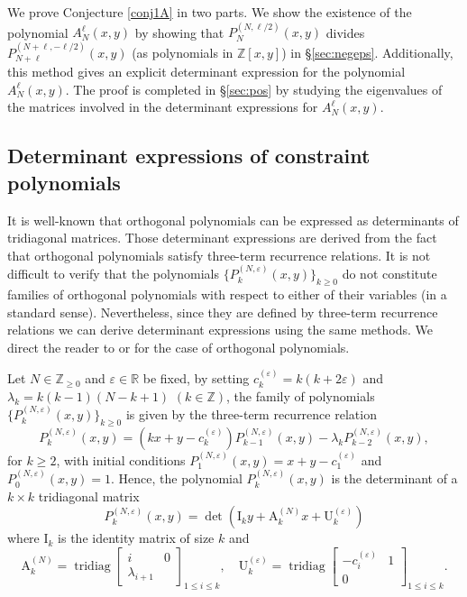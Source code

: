 \documentclass[11pt]{article}
\numberwithin{equation}{section}
\newcommand{\Z}{\mathbb{Z}} %
\newcommand{\R}{\mathbb{R}} %
\newcommand{\e}{\varepsilon}
\newcommand{\cp}[2]{P^{(#1)}_{#2}} %
\DeclareMathOperator{\tridiag}{tridiag}
\newcommand{\Tridiag}[4]{\tridiag\mat{#1 & #2 \\ #3}_{#4}}
\newcommand{\mat}[1]{\begin{bmatrix}#1\end{bmatrix}}
\newcommand{\MatSymbol}[1]{\bm{\mathrm{#1}}}
\newcommand{\mA}{\MatSymbol{A}}
\newcommand{\mI}{\MatSymbol{I}}
\newcommand{\mU}{\MatSymbol{U}}
\theoremstyle{plain}
\theoremstyle{definition}
\theoremstyle{remark}
\begin{document}
We prove Conjecture \ref{conj1A} in two parts. We show the existence of the polynomial \(A_N^{\ell}(x,y)\) by showing that
\(\cp{N,\ell/2}{N}(x,y)\) divides \(\cp{N+\ell,-\ell/2}{N+\ell}(x,y)\) (as polynomials in \(\Z[x,y]\)) in \S \ref{sec:negeps}.
Additionally, this method gives an explicit determinant expression for the polynomial \(A_N^{\ell}(x,y)\). The proof is completed
in \S \ref{sec:pos} by studying the eigenvalues of the matrices involved in the determinant expressions for \(A_N^{\ell}(x,y)\).

\subsection{Determinant expressions of constraint polynomials} \label{sec:detexp}

It is well-known that orthogonal polynomials can be expressed as determinants
of tridiagonal matrices. Those determinant expressions are derived from
the fact that orthogonal polynomials satisfy three-term recurrence relations.
It is not difficult to verify that the polynomials \(\{\cp{N,\e}{k}(x,y)\}_{k\geq 0}\) do not
constitute families of orthogonal polynomials with respect to either of their variables (in a standard sense).
Nevertheless, since they are defined by three-term recurrence relations we can derive determinant expressions
using the same methods. We direct the reader to \cite{C1978} or \cite{K2008} for
the case of orthogonal polynomials.

Let \(N \in \Z_{\geq 0}\) and \(\e \in \R\) be fixed, by setting \(c^{(\e)}_k = k(k+2\e) \) and \(\lambda_k = k(k-1)(N-k+1)\) \((k \in \Z)\), the family of polynomials \(\{\cp{N,\e}{k}(x,y)\}_{k \geq 0}\) is given by the three-term recurrence relation
\[
  \cp{N,\e}{k}(x,y) = ( k x + y -  c^{(\e)}_k) \cp{N,\e}{k-1}(x,y)  - \lambda_k \cp{N,\e}{k-2}(x,y),
\]
for \(k \geq 2\), with initial conditions \(\cp{N,\e}{1}(x,y)= x + y - c^{(\e)}_1\) and
\(\cp{N,\e}{0}(x,y) = 1\). Hence, the polynomial \(\cp{N,\e}{k}(x,y)\) is the determinant of a \(k\times k\)
tridiagonal matrix
\begin{equation}\label{eq:detForm1}
\cp{N,\e}{k}(x,y)=\det(\mI_k y+\mA^{(N)}_kx+\mU^{(\e)}_k)
\end{equation}
where
\(\mI_k\) is the identity matrix of size \(k\) and
\begin{equation*}
\mA^{(N)}_k=\Tridiag{i}{0}{\lambda_{i+1}}{1\le i\le k},\quad
\mU^{(\e)}_k=\Tridiag{-c^{(\e)}_i}{1}{0}{1\le i\le k}.
\end{equation*}
\end{document}

